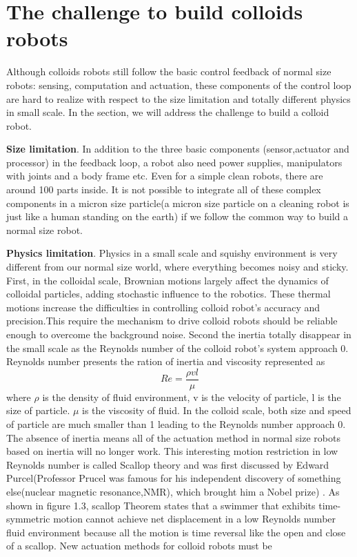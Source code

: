 \section{The challenge to  build colloids robots}
Although colloids robots still follow the basic control feedback of normal size robots: sensing, computation and actuation, these components of the control loop are hard to realize with respect to the size limitation and totally different physics in small scale. In the section, we will address the challenge to build a colloid robot. 

\textbf{Size limitation}. In addition to the three basic components (sensor,actuator and processor) in the feedback loop, a robot also need power supplies, manipulators with joints and a body frame etc. Even for a simple clean robots, there are around 100 parts inside. It is not possible to integrate all of these complex components in a micron size particle(a micron size particle on a cleaning robot is just like a human standing on the earth)  if we follow the common way to build a normal size robot. 

\textbf{Physics limitation}. Physics in a small scale and squishy  environment is very different from our normal size world, where everything becomes noisy and sticky. First, in the colloidal scale, Brownian motions largely affect the dynamics of colloidal particles, adding stochastic influence to the robotics. These thermal motions increase the difficulties in controlling colloid robot's accuracy and precision.This require the mechanism to drive colloid robots should be reliable enough to overcome the background noise. Second the inertia totally disappear in the small scale as the Reynolds number of the colloid robot's system approach 0.  Reynolds number presents the ration of inertia and viscosity represented as
\begin{equation}
    Re=\frac{\rho v l}{\mu}
\end{equation}
where $\rho $ is the density of fluid environment, v is the velocity of particle, l is the size of particle. $\mu$ is the  viscosity of fluid. In the colloid scale, both size and speed of particle are much smaller than 1 leading to the Reynolds number approach 0. The absence of inertia means all of the actuation method in normal size robots based on inertia will no longer work. This interesting  motion restriction in low Reynolds number is called Scallop
theory and was first discussed by Edward Purcel(Professor Prucel was famous for his independent discovery of something else(nuclear magnetic resonance,NMR), which brought him a Nobel prize) \cite{purcell1977life}. As shown in figure 1.3, scallop Theorem states that a swimmer that exhibits time-symmetric motion cannot achieve net displacement in a low Reynolds number fluid environment because all the motion is time reversal like the open and close of a scallop. New actuation methods for colloid robots must be 

